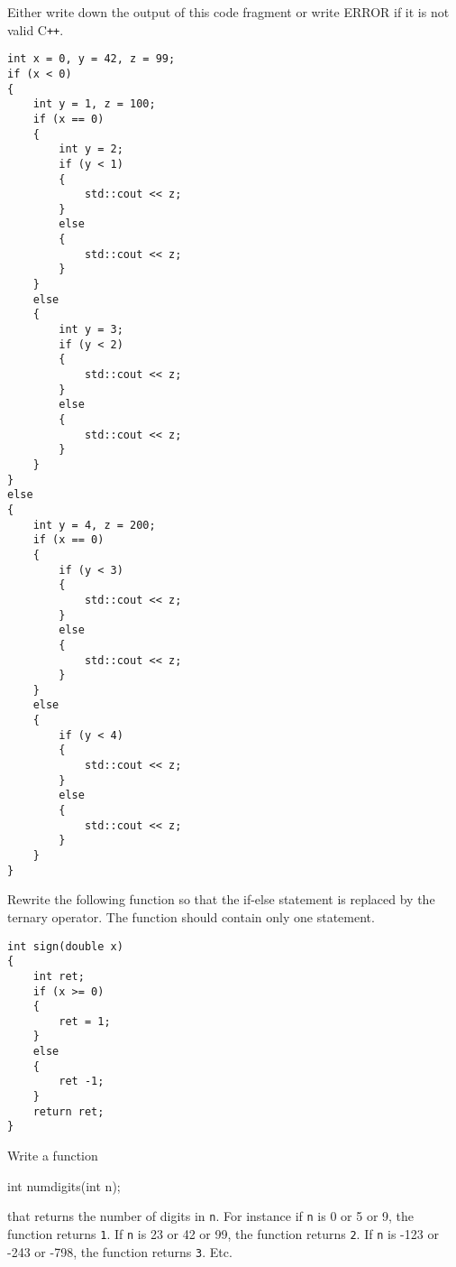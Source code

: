 

\nextq
Either write down the output of this code fragment or write ERROR
if it is not valid C\texttt{++}.
\begin{Verbatim}[fontsize=\scriptsize, frame=single]
int x = 0, y = 42, z = 99;
if (x < 0)
{
    int y = 1, z = 100;
    if (x == 0)
    {
        int y = 2;
        if (y < 1)
        {
            std::cout << z;
        }
        else
        {
            std::cout << z;
        }
    }
    else
    {
        int y = 3;
        if (y < 2)
        {
            std::cout << z;
        }
        else
        {
            std::cout << z;
        }
    }
}
else
{
    int y = 4, z = 200;
    if (x == 0)
    {
        if (y < 3)
        {
            std::cout << z;
        }
        else
        {
            std::cout << z;
        }
    }
    else
    {
        if (y < 4)
        {
            std::cout << z;
        }
        else
        {
            std::cout << z;
        }
    }
}
\end{Verbatim}
\vspace{-6pt}
\ANSWER
\begin{answercode}

\end{answercode}

\nextq
Rewrite the following function so that the if-else statement is replaced by
the ternary operator. The function should contain only one statement.
\begin{Verbatim}[frame=single, fontsize=\footnotesize]
int sign(double x)
{
    int ret;
    if (x >= 0)
    {
        ret = 1;
    }
    else
    {
        ret -1;
    }
    return ret;
}
\end{Verbatim}
\vspace{-6pt}
\ANSWER
\begin{answercode}

\end{answercode}

\nextq
Write a function
\begin{console}
int numdigits(int n);
\end{console}
that returns the number of digits in \verb!n!.
For instance if \verb!n! is 0 or 5 or 9, the function returns \verb!1!.
If \verb!n! is 23 or 42 or 99, the function returns \verb!2!.
If \verb!n! is -123 or -243 or -798, the function returns \verb!3!.
Etc.
\\
\ANSWER
\begin{answercode}

\end{answercode}

